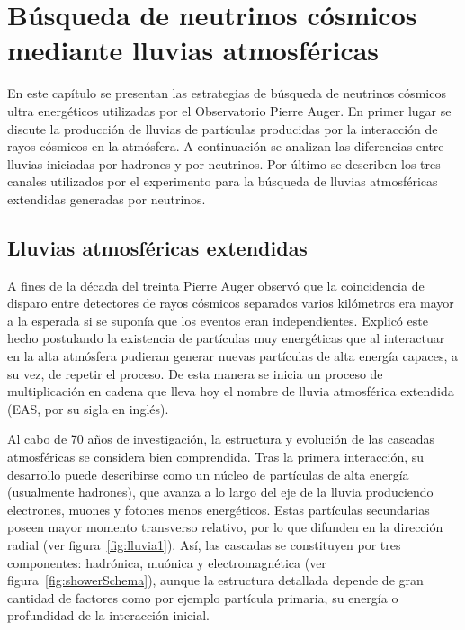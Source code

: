 \chapter{Búsqueda de neutrinos cósmicos mediante lluvias atmosféricas}
\label{ch:easAuger}

En este capítulo se presentan las estrategias de búsqueda de neutrinos cósmicos ultra energéticos utilizadas por el Observatorio Pierre Auger. En primer lugar se discute la producción de lluvias de partículas producidas por la interacción de rayos cósmicos en la atmósfera. A continuación se analizan las diferencias entre lluvias iniciadas por hadrones y por neutrinos. Por último se describen los tres canales utilizados por el experimento para la búsqueda de lluvias atmosf\'ericas extendidas generadas por neutrinos. 


\section{Lluvias atmosf\'ericas extendidas}

A fines de la década del treinta Pierre Auger observó que la coincidencia de disparo entre detectores de rayos c\'osmicos separados varios kilómetros era mayor a la esperada si se supon\'ia que los eventos eran independientes.
Explicó este hecho postulando la existencia de partículas muy energéticas que al interactuar en la alta atmósfera pudieran generar nuevas partículas de alta energía capaces, a su vez, de repetir el proceso. De esta manera se inicia un proceso de multiplicación en cadena que lleva hoy el nombre de lluvia atmosférica extendida (EAS, por su sigla en inglés). 

Al cabo de 70 años de investigación, la estructura y evolución de las cascadas atmosféricas se considera bien comprendida.
Tras la primera interacción, su desarrollo puede describirse como un núcleo de partículas de alta energía (usualmente hadrones), que avanza a lo largo del eje de la lluvia produciendo electrones, muones y fotones menos energéticos.
Estas part\'iculas secundarias poseen mayor momento transverso relativo, por lo que difunden en la dirección radial (ver figura~\ref{fig:lluvia1}). Así, las cascadas se constituyen por tres componentes: hadrónica, muónica y electromagnética (ver figura~\ref{fig:showerSchema}), aunque la estructura detallada depende de gran cantidad de factores como por ejemplo partícula primaria, su energ\'ia o profundidad de la interacción inicial.

